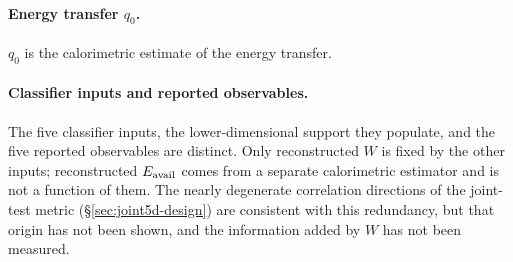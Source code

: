 \paragraph{Energy transfer $q_{0}$.} $q_{0}$ is the calorimetric estimate of the energy transfer.

\paragraph{Classifier inputs and reported observables.} The five classifier inputs, the lower-dimensional support they populate, and the five reported observables are distinct. Only reconstructed $W$ is fixed by the other inputs; reconstructed $E_{\mathrm{avail}}$ comes from a separate calorimetric estimator and is not a function of them. The nearly degenerate correlation directions of the joint-test metric (\S\ref{sec:joint5d-design}) are consistent with this redundancy, but that origin has not been shown, and the information added by $W$ has not been measured.


